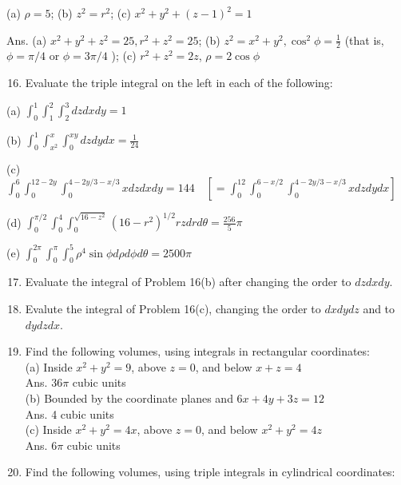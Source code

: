 \documentclass[10pt]{article}
\begin{document}
(a) $\rho=5$; (b) $z^{2}=r^{2}$; (c) $x^{2}+y^{2}+(z-1)^{2}=1$

Ans. (a) $x^{2}+y^{2}+z^{2}=25, r^{2}+z^{2}=25$; (b) $z^{2}=x^{2}+y^{2}, \cos ^{2} \phi=\frac{1}{2}$ (that is, $\phi=\pi / 4$ or $\phi=3 \pi / 4$ ); (c) $r^{2}+z^{2}=2 z$, $\rho=2 \cos \phi$

\begin{enumerate}
  \setcounter{enumi}{15}
  \item Evaluate the triple integral on the left in each of the following:
\end{enumerate}

(a) $\int_{0}^{1} \int_{1}^{2} \int_{2}^{3} d z d x d y=1$

(b) $\int_{0}^{1} \int_{x^{2}}^{x} \int_{0}^{x y} d z d y d x=\frac{1}{24}$

(c) $\int_{0}^{6} \int_{0}^{12-2 y} \int_{0}^{4-2 y / 3-x / 3} x d z d x d y=144 \quad\left[=\int_{0}^{12} \int_{0}^{6-x / 2} \int_{0}^{4-2 y / 3-x / 3} x d z d y d x\right]$

(d) $\int_{0}^{\pi / 2} \int_{0}^{4} \int_{0}^{\sqrt{16-z^{2}}}\left(16-r^{2}\right)^{1 / 2} r z d r d \theta=\frac{256}{5} \pi$

(e) $\int_{0}^{2 \pi} \int_{0}^{\pi} \int_{0}^{5} \rho^{4} \sin \phi d \rho d \phi d \theta=2500 \pi$

\begin{enumerate}
  \setcounter{enumi}{16}
  \item Evaluate the integral of Problem 16(b) after changing the order to $d z d x d y$.

  \item Evalute the integral of Problem 16(c), changing the order to $d x d y d z$ and to $d y d z d x$.

  \item Find the following volumes, using integrals in rectangular coordinates:\\
(a) Inside $x^{2}+y^{2}=9$, above $z=0$, and below $x+z=4$\\
Ans. $36 \pi$ cubic units\\
(b) Bounded by the coordinate planes and $6 x+4 y+3 z=12$\\
Ans. 4 cubic units\\
(c) Inside $x^{2}+y^{2}=4 x$, above $z=0$, and below $x^{2}+y^{2}=4 z$\\
Ans. $6 \pi$ cubic units

  \item Find the following volumes, using triple integrals in cylindrical coordinates:

\end{enumerate}
\end{document}
